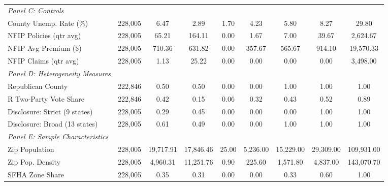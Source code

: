 \begin{table}[htbp]
{\begin{tabular}{l*{1}{cccccccc}}
\textit{Panel C: Controls}&            &            &            &            &            &            &            &            \\
County Unemp. Rate (\%)&     228,005&        6.47&        2.89&        1.70&        4.23&        5.80&        8.27&       29.80\\
NFIP Policies (qtr avg)&     228,005&       65.21&      164.11&        0.00&        1.67&        7.00&       39.67&    2,624.67\\
NFIP Avg Premium (\$)&     228,005&      710.36&      631.82&        0.00&      357.67&      565.67&      914.10&   19,570.33\\
NFIP Claims (qtr avg)&     228,005&        1.13&       25.22&        0.00&        0.00&        0.00&        0.00&    3,498.00\\
\textit{Panel D: Heterogeneity Measures}&            &            &            &            &            &            &            &            \\
Republican County   &     222,846&        0.50&        0.50&        0.00&        0.00&        1.00&        1.00&        1.00\\
R Two-Party Vote Share&     222,846&        0.42&        0.15&        0.06&        0.32&        0.43&        0.52&        0.89\\
Disclosure: Strict (9 states)&     228,005&        0.29&        0.45&        0.00&        0.00&        0.00&        1.00&        1.00\\
Disclosure: Broad (13 states)&     228,005&        0.61&        0.49&        0.00&        0.00&        1.00&        1.00&        1.00\\
\textit{Panel E: Sample Characteristics}&            &            &            &            &            &            &            &            \\
Zip Population      &     228,005&   19,717.91&   17,846.46&       25.00&    5,236.00&   15,229.00&   29,309.00&  109,931.00\\
Zip Pop. Density    &     228,005&    4,960.31&   11,251.76&        0.90&      225.60&    1,571.80&    4,837.00&  143,070.70\\
SFHA Zone Share     &     228,005&        0.35&        0.31&        0.00&        0.00&        0.33&        0.60&        1.00\\
\hline\hline
\end{tabular}
}%
\end{table}
